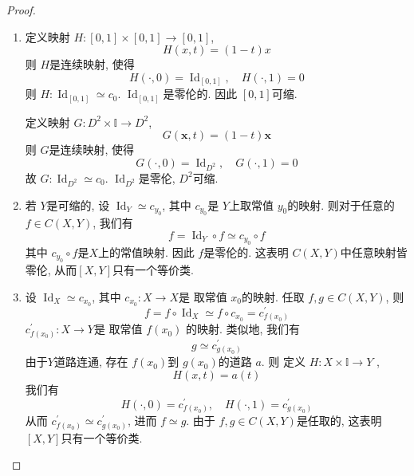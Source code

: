\documentclass[../main.tex]{subfiles}
\begin{document}
\begin{proof}
    \begin{enumerate}
        \item 定义映射 \(  H: [0,1]\times [0,1]\to [0,1]  \), \[
        H\left( x,t \right)= \left( 1-t \right)x  
        \] 则 \(  H  \)是连续映射, 使得 \[
        H\left( \cdot ,0 \right)= \operatorname{Id}_{[0,1]},\quad H\left( \cdot ,1 \right)= 0  
        \] 则 \(  H: \operatorname{Id}_{[0,1]}\simeq c_{0}  \). \(  \operatorname{Id}_{[0,1]}  \)是零伦的. 因此 \(  \left[ 0,1 \right]   \)可缩.
        
    定义映射 \(  G: D^{2}\times \mathbb{I}\to D^{2}  \), \[
        G\left( \mathbf{x},t \right)= \left( 1-t \right)\mathbf{x}  
        \] 则 \(  G  \)是连续映射,  使得 \[
        G\left( \cdot ,0 \right)= \operatorname{Id}_{D^{2}} ,\quad G\left( \cdot ,1 \right)= 0 
        \]故 \(  G  : \operatorname{Id}_{D^{2}}\simeq c_0\).  \(  \operatorname{Id}_{D^{2}}  \)是零伦, \(  D^{2}  \)可缩.
        \item 若 \(  Y  \)是可缩的, 设 \(  \operatorname{Id}_{Y}\simeq c_{y_0}  \), 其中 \(  c_{y_0}  \)是 \(  Y  \)上取常值 \(  y_0  \)的映射.    则对于任意的 \(  f\in C\left( X,Y \right)   \), 我们有 \[
        f= \operatorname{Id}_{Y}\circ f\simeq c_{y_0}\circ f
        \]其中 \(  c_{y_0}\circ f  \)是\(  X  \)上的常值映射.  因此 \(  f  \)是零伦的. 这表明 \(  C\left( X,Y \right)   \)中任意映射皆零伦, 从而\(  [X,Y]  \)只有一个等价类.
        \item 设 \(  \operatorname{Id}_{X}\simeq c_{x_0}  \), 其中 \(  c_{x_0} :X\to X \)是 取常值 \(  x_0  \)的映射.    任取 \(  f ,g\in C\left( X,Y \right)   \), 则 \[
        f= f\circ \operatorname{Id}_{X}\simeq f\circ c_{x_0}= c^{\prime} _{f\left( x_0 \right) }
        \]  \(  c^{\prime} _{f\left( x_0 \right) } :X\to Y \)是 取常值 \(  f\left( x_0 \right)   \) 的映射.      类似地, 我们有 \[
        g\simeq c^{\prime} _{g\left( x_0 \right) }
        \]由于\(  Y  \)道路连通, 存在 \(  f\left( x_0 \right)   \)到 \(  g\left( x_0 \right)   \)的道路 \(  a  \). 则 定义 \(  H: X\times \mathbb{I}\to Y  \) ,  \[
        H\left( x,t \right)= a\left( t \right)  
        \] 我们有 \[
        H\left( \cdot ,0 \right)= c^{\prime} _{f\left( x_0 \right) },\quad H\left( \cdot ,1 \right)= c^{\prime} _{g\left( x_0 \right) }  
        \]从而 \(  c^{\prime} _{f\left( x_0 \right) }\simeq c^{\prime} _{g\left( x_0 \right) }  \), 进而 \(  f\simeq g  \). 由于 \(  f,g\in C\left( X,Y \right)   \)是任取的,  这表明 \(  [X,Y]  \)只有一个等价类.   
    \end{enumerate}
    
\end{proof}
\end{document}
